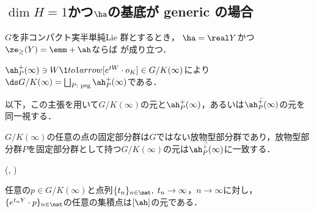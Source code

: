 \subsection{$\dim H =1$かつ$\ha$の基底が generic の場合}
\begin{thm}\label{thm:0106-main}
    $G$を非コンパクト実半単純Lie 群とするとき，
    $\ha = \real Y$かつ$\ze_{\ge}(Y) = \emm + \ah$ならば  が成り立つ．
\end{thm}


\begin{lem}\cite[Corollary~I.2.17]{borel-ji}\label{lem:bj-1.2.17}
  
  $\ah_{P}^{+}(\infty)\ni W\1to1arrow [e^{tW}\cdot o_K]\in G/K(\infty) $により$\ds G/K(\infty) = \bigsqcup_{P:\text{ psg}}\ah_{P}^{+}(\infty) $である．

  以下，この主張を用いて$G/K(\infty) $の元と$\ah_{P}^{+}(\infty)$，あるいは$\bar{\ah_{P}^{+}(\infty)} $の元を同一視する．
\end{lem}
\begin{lem}\cite[Proposition~I.2.6, Corollary~I.2.17]{borel-ji}\label{lem:bj-1.2.6}

  $G/K(\infty) $の任意の点の固定部分群は$G$ではない放物型部分群であり，放物型部分群$P$を固定部分群として持つ$G/K(\infty) $の元は$\bar{\ah_{P}^{+}(\infty)} $に一致する．
  
\end{lem}



\begin{lem}(\cite[Proposition~6.7]{eo73}, \cite[2.8~Lemma]{bbe85})\label{lem:axis-isometry}
  
  任意の$p\in G/K(\infty) $と点列$\{t_n\}_{n\in \nat},\; t_n\to \infty $，$n\to \infty$に対し，$\{e^{t_nY}\cdot p\}_{n\in \nat} $の任意の集積点は$[\ah]$の元である．
\end{lem}



